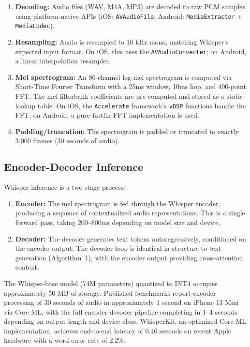 \documentclass[12pt, letterpaper, twoside]{report}
\begin{document}
\begin{enumerate}[itemsep=3pt]
\item \textbf{Decoding:} Audio files (WAV, M4A, MP3) are decoded to raw PCM samples using platform-native APIs (iOS: \texttt{AVAudioFile}; Android: \texttt{MediaExtractor} + \texttt{MediaCodec}).
\item \textbf{Resampling:} Audio is resampled to 16 kHz mono, matching Whisper's expected input format. On iOS, this uses the \texttt{AVAudioConverter}; on Android, a linear interpolation resampler.
\item \textbf{Mel spectrogram:} An 80-channel log-mel spectrogram is computed via Short-Time Fourier Transform with a 25ms window, 10ms hop, and 400-point FFT. The mel filterbank coefficients are pre-computed and stored as a static lookup table. On iOS, the \texttt{Accelerate} framework's \texttt{vDSP} functions handle the FFT; on Android, a pure-Kotlin FFT implementation is used.
\item \textbf{Padding/truncation:} The spectrogram is padded or truncated to exactly 3,000 frames (30 seconds of audio).
\end{enumerate}

\subsection{Encoder-Decoder Inference}
\label{subsec:whisper_inference}

Whisper inference is a two-stage process:

\begin{enumerate}[itemsep=3pt]
\item \textbf{Encoder:} The mel spectrogram is fed through the Whisper encoder, producing a sequence of contextualized audio representations. This is a single forward pass, taking 200--800ms depending on model size and device.
\item \textbf{Decoder:} The decoder generates text tokens autoregressively, conditioned on the encoder output. The decoder loop is identical in structure to text generation (Algorithm~1), with the encoder output providing cross-attention context.
\end{enumerate}

The Whisper-base model (74M parameters) quantized to INT4 occupies approximately 50 MB of storage. Published benchmarks report encoder processing of 30 seconds of audio in approximately 1 second on iPhone 13 Mini via Core ML, with the full encoder-decoder pipeline completing in 1--4 seconds depending on output length and device class. WhisperKit, an optimized Core ML implementation, achieves end-to-end latency of 0.46 seconds on recent Apple hardware with a word error rate of 2.2\%.
\end{document}
